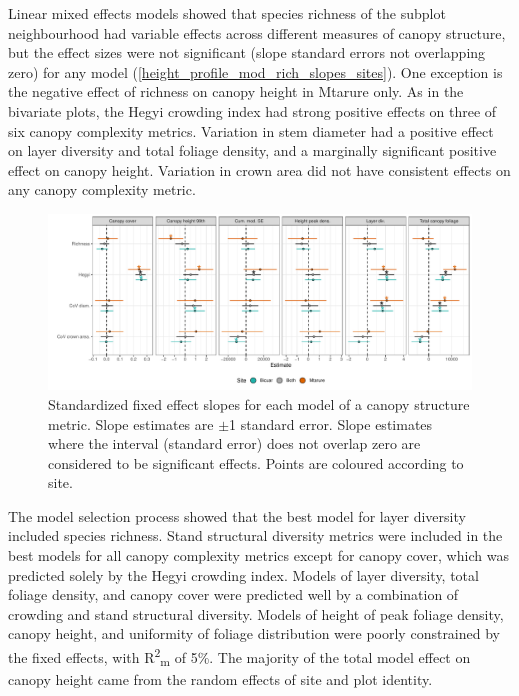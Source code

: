 \documentclass[11pt,a4paper]{article}
\newcommand{\textapprox}{\raisebox{0.5ex}{\texttildelow}}  %
\begin{document}
Linear mixed effects models showed that species richness of the subplot neighbourhood had variable effects across different measures of canopy structure, but the effect sizes were not significant (slope standard errors not overlapping zero) for any model (\autoref{height_profile_mod_rich_slopes_sites}). One exception is the negative effect of richness on canopy height in Mtarure only. As in the bivariate plots, the Hegyi crowding index had strong positive effects on three of six canopy complexity metrics. Variation in stem diameter had a positive effect on layer diversity and total foliage density, and a marginally significant positive effect on canopy height. Variation in crown area did not have consistent effects on any canopy complexity metric.

\begin{figure}[H]
\centering
	\includegraphics[width=\textwidth]{height_profile_mod_rich_slopes_sites}
	\caption{Standardized fixed effect slopes for each model of a canopy structure metric. Slope estimates are $\pm$1 standard error. Slope estimates where the interval (standard error) does not overlap zero are considered to be significant effects. Points are coloured according to site.}
	\label{height_profile_mod_rich_slopes_sites}
\end{figure}

The model selection process showed that the best model for layer diversity included species richness. Stand structural diversity metrics were included in the best models for all canopy complexity metrics except for canopy cover, which was predicted solely by the Hegyi crowding index. Models of layer diversity, total foliage density, and canopy cover were predicted well by a combination of crowding and stand structural diversity. Models of height of peak foliage density, canopy height, and uniformity of foliage distribution were poorly constrained by the fixed effects, with R\textsuperscript{2}\textsubscript{m} of \textapprox{}5\%. The majority of the total model effect on canopy height came from the random effects of site and plot identity.
\end{document}
